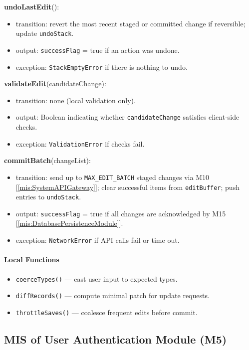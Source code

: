 \documentclass[12pt, titlepage]{article}
\begin{document}
  \noindent \textbf{undoLastEdit}():
  \begin{itemize}
    \item transition: revert the most recent staged or committed change if reversible; update \texttt{undoStack}.
    \item output: \texttt{successFlag} = true if an action was undone.
    \item exception: \texttt{StackEmptyError} if there is nothing to undo.
  \end{itemize}

  \noindent \textbf{validateEdit}(candidateChange):
  \begin{itemize}
    \item transition: none (local validation only).
    \item output: Boolean indicating whether \texttt{candidateChange} satisfies client-side checks.
    \item exception: \texttt{ValidationError} if checks fail.
  \end{itemize}

  \noindent \textbf{commitBatch}(changeList):
  \begin{itemize}
    \item transition: send up to \texttt{MAX\_EDIT\_BATCH} staged changes via M10 [\ref{mis:SystemAPIGateway}]; clear successful items from \texttt{editBuffer}; push entries to \texttt{undoStack}.
    \item output: \texttt{successFlag} = true if all changes are acknowledged by M15 [\ref{mis:DatabasePersistenceModule}].
    \item exception: \texttt{NetworkError} if API calls fail or time out.
  \end{itemize}

  \paragraph{Local Functions}
  \begin{itemize}
    \item \texttt{coerceTypes()} — cast user input to expected types.
    \item \texttt{diffRecords()} — compute minimal patch for update requests.
    \item \texttt{throttleSaves()} — coalesce frequent edits before commit.
  \end{itemize}


\subsection{MIS of User Authentication Module (M5)}
\label{mis:UserAuthentication}
\end{document}
